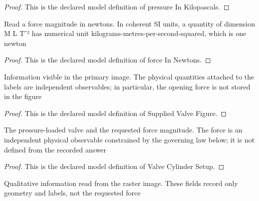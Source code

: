 \begin{proof}
  This is the declared model definition of pressure In Kilopascals.
\end{proof}
\begin{definition}
  \label{def:physics:phyx-mini-0383:phyxminiproblems-problemphyxmini0383-forceinnewtons}
  Read a force magnitude in newtons. In coherent SI units, a quantity of dimension M L T⁻² has numerical unit kilograms-metres-per-second-squared, which is one newton
\end{definition}
\begin{proof}
  This is the declared model definition of force In Newtons.
\end{proof}
\begin{definition}
  \label{def:physics:phyx-mini-0383:phyxminiproblems-problemphyxmini0383-suppliedvalvefigure}
  Information visible in the primary image. The physical quantities attached to the labels are independent observables; in particular, the opening force is not stored in the figure
\end{definition}
\begin{proof}
  This is the declared model definition of Supplied Valve Figure.
\end{proof}
\begin{definition}
  \label{def:physics:phyx-mini-0383:phyxminiproblems-problemphyxmini0383-valvecylindersetup}
  The pressure-loaded valve and the requested force magnitude. The force is an independent physical observable constrained by the governing law below; it is not defined from the recorded answer
\end{definition}
\begin{proof}
  This is the declared model definition of Valve Cylinder Setup.
\end{proof}
\begin{definition}
  \label{def:physics:phyx-mini-0383:phyxminiproblems-problemphyxmini0383-matchessuppliedvalvefigure}
  Qualitative information read from the raster image. These fields record only geometry and labels, not the requested force
\end{definition}
